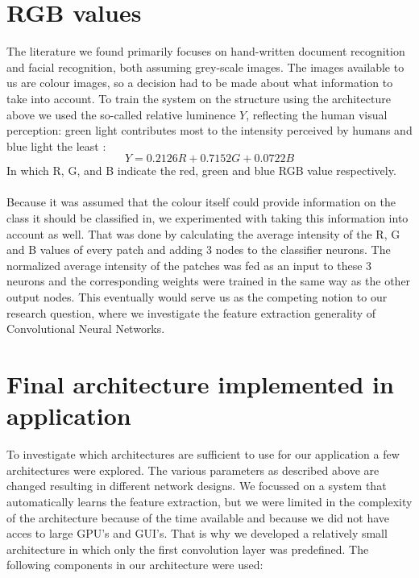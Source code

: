\documentclass[a4paper,onecolumn]{report}
\begin{document}
\section{RGB values}
\label{sec:RGB}
The literature we found primarily focuses on hand-written document recognition and facial recognition, both assuming grey-scale images. The images available to us are colour images, so a decision had to be made about what information to take into account. To train the system on the structure using the architecture above we used the so-called relative luminence $Y$, reflecting the human visual perception: green light contributes most to the intensity perceived by humans and blue light the least \cite{stokes1996standard}:
\begin{equation}
Y=0.2126 R+0.7152 G+0.0722 B
\end{equation}
\noindent
In which R, G, and B indicate the red, green and blue RGB value respectively.
\\\\
Because it was assumed that the colour itself could provide information on the class it should be classified in, we experimented with taking this information into account as well. That was done by calculating the average intensity of the R, G and B values of every patch and adding 3 nodes to the classifier neurons. The normalized average intensity of the patches was fed as an input to these 3 neurons and the corresponding weights were trained in the same way as the other output nodes. This eventually would serve us as the competing notion to our research question, where we investigate the feature extraction generality of Convolutional Neural Networks. 

\section{Final architecture implemented in application}
\label{sec:finalimpl}
To investigate which architectures are sufficient to use for our application a few architectures were explored. The various parameters as described above are changed resulting in different network designs. We focussed on a system that automatically learns the feature extraction, but we were limited in the complexity of the architecture because of the time available and because we did not have acces to large GPU's and GUI's. That is why we developed a relatively small architecture in which only the first convolution layer was predefined. The following components in our architecture were used:
\end{document}
